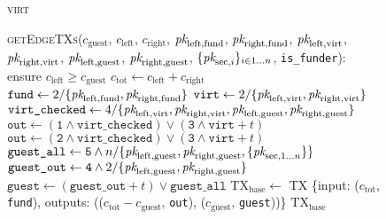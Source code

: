 \begin{figure}[H]
  \begin{processbox}{\textsc{virt}}
    \begin{algorithmic}[1]
      \State {}
      \State \textsc{getEdgeTXs}($c_{\mathrm{guest}}$, $c_{\mathrm{left}}$,
      $c_{\mathrm{right}}$, $\textit{pk}_{\mathrm{left}, \mathrm{fund}}$,
      $\textit{pk}_{\mathrm{right}, \mathrm{fund}}$, $\textit{pk}_{\mathrm{left}, \mathrm{virt}}$,
      $\textit{pk}_{\mathrm{right}, \mathrm{virt}}$, $\textit{pk}_{\mathrm{left},
      \mathrm{guest}}$, $\textit{pk}_{\mathrm{right}, \mathrm{guest}}$,
      $\{\textit{pk}_{\mathrm{sec}, i}\}_{i \in 1 \dots n}$, \texttt{is\_funder}):
      \Indent
        \State ensure $c_{\mathrm{left}} \geq c_{\mathrm{guest}}$
        \State $c_{\mathrm{tot}} \gets c_{\mathrm{left}} + c_{\mathrm{right}}$
        \State $\texttt{fund} \gets 2/\{\textit{pk}_{\mathrm{left}, \mathrm{fund}},
        \textit{pk}_{\mathrm{right}, \mathrm{fund}}\}$
        \State $\texttt{virt} \gets 2/\{\textit{pk}_{\mathrm{left}, \mathrm{virt}},
        \textit{pk}_{\mathrm{right}, \mathrm{virt}}\}$
        \State $\texttt{virt\_checked} \gets 4/\{\textit{pk}_{\mathrm{left},
        \mathrm{virt}}, \textit{pk}_{\mathrm{right}, \mathrm{virt}}, \textit{pk}_{\mathrm{left},
        \mathrm{guest}}, \textit{pk}_{\mathrm{right}, \mathrm{guest}}\}$
          \State $\texttt{out} \gets (\texttt{1} \wedge \texttt{virt\_checked})
          \vee (\texttt{3} \wedge \texttt{virt} + t)$
        \Else \: 
          \State $\texttt{out} \gets (\texttt{2} \wedge \texttt{virt\_checked})
          \vee (\texttt{3} \wedge \texttt{virt} + t)$
        \EndIf
        \State $\texttt{guest\_all} \gets \texttt{5} \wedge
        n/\{\textit{pk}_{\mathrm{left}, \mathrm{guest}}, \textit{pk}_{\mathrm{right},
        \mathrm{guest}}, \{\textit{pk}_{\mathrm{sec}, 1 \dots n}\}\}$
        \State $\texttt{guest\_out} \gets \texttt{4} \wedge
        2/\{\textit{pk}_{\mathrm{left}, \mathrm{guest}}, \textit{pk}_{\mathrm{right},
        \mathrm{guest}}\}$
        \State $\texttt{guest} \gets (\texttt{guest\_out} + t) \vee
        \texttt{guest\_all}$
        \State $\mathrm{TX}_{\mathrm{base}} \gets$ TX \{input:
        ($c_{\mathrm{tot}}$, \texttt{fund}), outputs: (($c_{\mathrm{tot}} -
        c_{\mathrm{guest}}$, \texttt{out}), ($c_{\mathrm{guest}}$,
        \texttt{guest}))\}
        \State \Return $\mathrm{TX}_{\mathrm{base}}$
      \EndIndent
    \end{algorithmic}
  \end{processbox}
  \caption{}
  \label{code:virtual-layer:edge-txs}
\end{figure}

